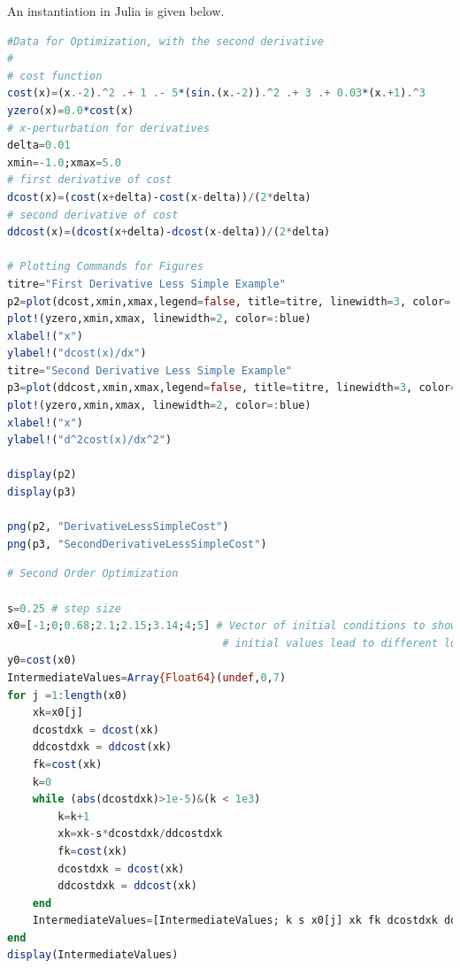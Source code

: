 An instantiation in Julia is given below.

\Qed

\begin{lstlisting}[language=Julia,style=mystyle]
#Data for Optimization, with the second derivative
#
# cost function
cost(x)=(x.-2).^2 .+ 1 .- 5*(sin.(x.-2)).^2 .+ 3 .+ 0.03*(x.+1).^3
yzero(x)=0.0*cost(x)
# x-perturbation for derivatives
delta=0.01
xmin=-1.0;xmax=5.0
# first derivative of cost
dcost(x)=(cost(x+delta)-cost(x-delta))/(2*delta)
# second derivative of cost
ddcost(x)=(dcost(x+delta)-dcost(x-delta))/(2*delta)

# Plotting Commands for Figures
titre="First Derivative Less Simple Example"
p2=plot(dcost,xmin,xmax,legend=false, title=titre, linewidth=3, color=:red )
plot!(yzero,xmin,xmax, linewidth=2, color=:blue)
xlabel!("x")
ylabel!("dcost(x)/dx")
titre="Second Derivative Less Simple Example"
p3=plot(ddcost,xmin,xmax,legend=false, title=titre, linewidth=3, color=:red )
plot!(yzero,xmin,xmax, linewidth=2, color=:blue)
xlabel!("x")
ylabel!("d^2cost(x)/dx^2")

display(p2)
display(p3)

png(p2, "DerivativeLessSimpleCost") 
png(p3, "SecondDerivativeLessSimpleCost") 
\end{lstlisting}

\begin{lstlisting}[language=Julia,style=mystyle]
# Second Order Optimization

s=0.25 # step size
x0=[-1;0;0.68;2.1;2.15;3.14;4;5] # Vector of initial conditions to show that different 
                                  # initial values lead to different local extrema
y0=cost(x0)
IntermediateValues=Array{Float64}(undef,0,7)
for j =1:length(x0)
    xk=x0[j]
    dcostdxk = dcost(xk)
    ddcostdxk = ddcost(xk)
    fk=cost(xk)
    k=0
    while (abs(dcostdxk)>1e-5)&(k < 1e3)
        k=k+1
        xk=xk-s*dcostdxk/ddcostdxk
        fk=cost(xk)
        dcostdxk = dcost(xk)
        ddcostdxk = ddcost(xk)
    end
    IntermediateValues=[IntermediateValues; k s x0[j] xk fk dcostdxk ddcostdxk]
end
display(IntermediateValues)
\end{lstlisting}

